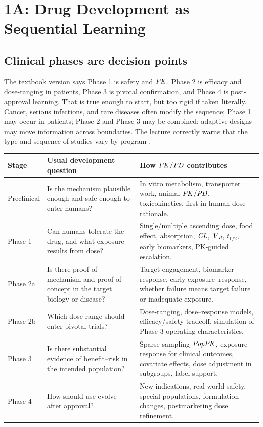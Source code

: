 \documentclass[a4paper]{article}
\newcommand{\CL}{\ensuremath{\pksym{CL}}}
\newcommand{\Vd}{\ensuremath{\pksym{V}_d}}
\newcommand{\PopPK}{\ensuremath{\pksym{PopPK}}}
\newcommand{\PK}{\ensuremath{\pksym{PK}}}
\newcommand{\PKPD}{\ensuremath{\pksym{PK}/\pksym{PD}}}
\begin{document}
\section{1A: Drug Development as Sequential Learning}

\subsection{Clinical phases are decision points}

The textbook version says Phase 1 is safety and \PK, Phase 2 is efficacy and dose-ranging in patients, Phase 3 is pivotal confirmation, and Phase 4 is post-approval learning. That is true enough to start, but too rigid if taken literally. Cancer, serious infections, and rare diseases often modify the sequence; Phase 1 may occur in patients; Phase 2 and Phase 3 may be combined; adaptive designs may move information across boundaries. The lecture correctly warns that the type and sequence of studies vary by program \cite{ufPha6125Lesson1A2020}.

\begin{center}
\footnotesize
\begin{tabularx}{\textwidth}{p{}X X}
\toprule
Stage & Usual development question & How \PKPD{} contributes \\
\midrule
Preclinical &
Is the mechanism plausible enough and safe enough to enter humans? &
In vitro metabolism, transporter work, animal \PKPD, toxicokinetics, first-in-human dose rationale. \\
Phase 1 &
Can humans tolerate the drug, and what exposure results from dose? &
Single/multiple ascending dose, food effect, absorption, \CL, \Vd, \(t_{1/2}\), early biomarkers, PK-guided escalation. \\
Phase 2a &
Is there proof of mechanism and proof of concept in the target biology or disease? &
Target engagement, biomarker response, early exposure--response, whether failure means target failure or inadequate exposure. \\
Phase 2b &
Which dose range should enter pivotal trials? &
Dose-ranging, dose--response models, efficacy/safety tradeoff, simulation of Phase 3 operating characteristics. \\
Phase 3 &
Is there substantial evidence of benefit--risk in the intended population? &
Sparse-sampling \PopPK, exposure--response for clinical outcomes, covariate effects, dose adjustment in subgroups, label support. \\
Phase 4 &
How should use evolve after approval? &
New indications, real-world safety, special populations, formulation changes, postmarketing dose refinement. \\
\bottomrule
\end{tabularx}
\end{center}
\end{document}
